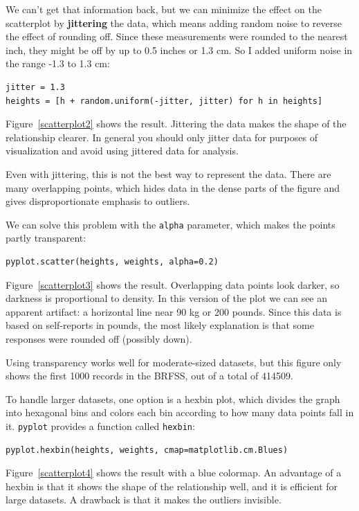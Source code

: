 \documentclass[12pt]{book}
\begin{document}
We can't get that information back, but we can minimize the effect on
the scatterplot by {\bf jittering} the data, which means adding random
noise to reverse the effect of rounding off.  Since these measurements
were rounded to the nearest inch, they might be off by up to 0.5 inches or
1.3 cm.  So I added uniform noise in the range -1.3 to 1.3 cm:
%
\begin{verbatim}
jitter = 1.3
heights = [h + random.uniform(-jitter, jitter) for h in heights]
\end{verbatim}

Figure~\ref{scatterplot2} shows the result.  Jittering the data makes
the shape of the relationship clearer.  In general you should only jitter
data for purposes of visualization and avoid using jittered data
for analysis.

Even with jittering, this is not the best way to represent the data.
There are many overlapping points, which hides data
in the dense parts of the figure and gives disproportionate emphasis
to outliers.

We can solve this problem with the {\tt alpha} parameter, which makes
the points partly transparent:
%
\begin{verbatim}
pyplot.scatter(heights, weights, alpha=0.2)
\end{verbatim}
%
Figure~\ref{scatterplot3} shows the result.  Overlapping data
points look darker, so darkness is proportional to density.  In this
version of the plot we can see an apparent artifact: a horizontal line
near 90 kg or 200 pounds.  Since this data is based on self-reports in
pounds, the most likely explanation is that some responses were rounded off
(possibly down).

Using transparency works well for moderate-sized datasets, but this
figure only shows the first 1000 records in the BRFSS, out of a total
of 414509.

To handle larger datasets, one option is a hexbin plot, which divides
the graph into hexagonal bins and colors each bin according to how many
data points fall in it.  {\tt pyplot} provides a function called 
{\tt hexbin}:
%
\begin{verbatim}
pyplot.hexbin(heights, weights, cmap=matplotlib.cm.Blues)
\end{verbatim}
%
Figure~\ref{scatterplot4} shows the result with a blue colormap.
An advantage of a hexbin is that it shows the shape of the relationship
well, and it is efficient for large datasets.  A drawback is that
it makes the outliers invisible.
\end{document}
